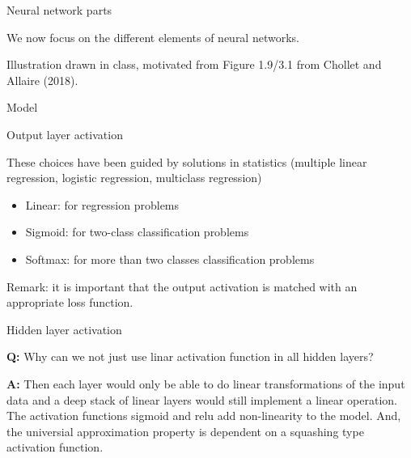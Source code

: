 \documentclass[10pt,ignorenonframetext,]{beamer}
\providecommand{\tightlist}{%
  \setlength{\itemsep}{0pt}\setlength{\parskip}{0pt}}
\begin{document}
\begin{frame}{Neural network parts}
\protect\hypertarget{neural-network-parts}{}

We now focus on the different elements of neural networks.

Illustration drawn in class, motivated from Figure 1.9/3.1 from Chollet
and Allaire (2018).

\end{frame}

\begin{frame}

\begin{block}{Model}

\begin{block}{Output layer activation}

These choices have been guided by solutions in statistics (multiple
linear regression, logistic regression, multiclass regression)

\begin{itemize}
\tightlist
\item
  Linear: for regression problems
\item
  Sigmoid: for two-class classification problems
\item
  Softmax: for more than two classes classification problems
\end{itemize}

Remark: it is important that the output activation is matched with an
appropriate loss function.

\end{block}

\end{block}

\end{frame}

\begin{frame}

\begin{block}{Hidden layer activation}

\textbf{Q:} Why can we not just use linar activation function in all
hidden layers?

\end{block}

\end{frame}

\begin{frame}

\textbf{A:} Then each layer would only be able to do linear
transformations of the input data and a deep stack of linear layers
would still implement a linear operation. The activation functions
sigmoid and relu add non-linearity to the model. And, the universial
approximation property is dependent on a squashing type activation
function.

\end{frame}
\end{document}
